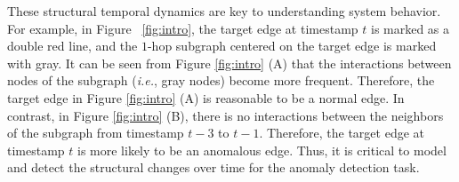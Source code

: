 \documentclass{article}
\newcommand{\zach}[1]{\textcolor{red}{(zach: #1)}}
\newcommand{\nop}[1]{}
\begin{document}
These structural temporal dynamics are key to understanding system behavior. For example, in Figure ~\ref{fig:intro}, the target edge at timestamp $t$ is marked as a double red line, and the $1$-hop subgraph centered on the target edge is marked with gray. It can be seen from Figure \ref{fig:intro} (A) that the interactions between nodes of the subgraph (\textit{i.e.}, gray nodes) become more frequent. Therefore, the target edge in Figure \ref{fig:intro} (A) is reasonable to be a normal edge. In contrast, in Figure \ref{fig:intro} (B), there is no interactions between the neighbors of the subgraph from timestamp $t-3$ to $t-1$. Therefore, the target edge at timestamp $t$ is more likely to be an anomalous edge. Thus, it is critical to model and detect the structural changes over time for the anomaly detection task.





\nop{Recently,
	network embedding has proven a powerful tool in learning the
	low-dimensional representations of vertices in networks that can
	capture and preserve the network structure. However, most existing
	network embedding approaches are designed for static networks,
	and thus may not be perfectly suited for a dynamic environment in
	which the network representation has to be constantly updated  }
\end{document}

